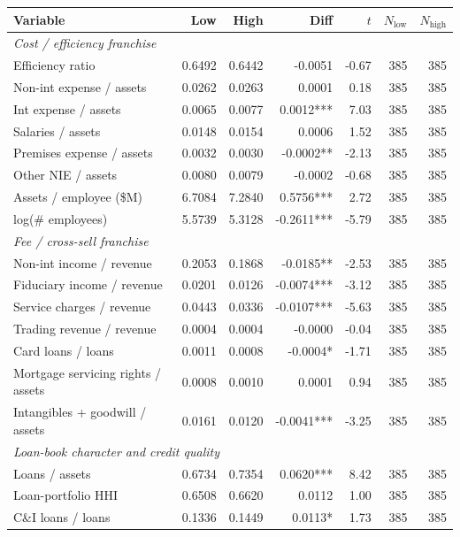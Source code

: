 \begin{tabular}{lrrrrrr}
\toprule
Variable & Low & High & Diff & $t$ & $N_{\text{low}}$ & $N_{\text{high}}$ \\
\midrule
\multicolumn{7}{l}{\emph{Cost / efficiency franchise}} \\
\midrule
Efficiency ratio & 0.6492 & 0.6442 & -0.0051 & -0.67 & 385 & 385 \\
Non-int expense / assets & 0.0262 & 0.0263 & 0.0001 & 0.18 & 385 & 385 \\
Int expense / assets & 0.0065 & 0.0077 & 0.0012*** & 7.03 & 385 & 385 \\
Salaries / assets & 0.0148 & 0.0154 & 0.0006 & 1.52 & 385 & 385 \\
Premises expense / assets & 0.0032 & 0.0030 & -0.0002** & -2.13 & 385 & 385 \\
Other NIE / assets & 0.0080 & 0.0079 & -0.0002 & -0.68 & 385 & 385 \\
Assets / employee (\$M) & 6.7084 & 7.2840 & 0.5756*** & 2.72 & 385 & 385 \\
log(\# employees) & 5.5739 & 5.3128 & -0.2611*** & -5.79 & 385 & 385 \\
\midrule
\multicolumn{7}{l}{\emph{Fee / cross-sell franchise}} \\
\midrule
Non-int income / revenue & 0.2053 & 0.1868 & -0.0185** & -2.53 & 385 & 385 \\
Fiduciary income / revenue & 0.0201 & 0.0126 & -0.0074*** & -3.12 & 385 & 385 \\
Service charges / revenue & 0.0443 & 0.0336 & -0.0107*** & -5.63 & 385 & 385 \\
Trading revenue / revenue & 0.0004 & 0.0004 & -0.0000 & -0.04 & 385 & 385 \\
Card loans / loans & 0.0011 & 0.0008 & -0.0004* & -1.71 & 385 & 385 \\
Mortgage servicing rights / assets & 0.0008 & 0.0010 & 0.0001 & 0.94 & 385 & 385 \\
Intangibles + goodwill / assets & 0.0161 & 0.0120 & -0.0041*** & -3.25 & 385 & 385 \\
\midrule
\multicolumn{7}{l}{\emph{Loan-book character and credit quality}} \\
\midrule
Loans / assets & 0.6734 & 0.7354 & 0.0620*** & 8.42 & 385 & 385 \\
Loan-portfolio HHI & 0.6508 & 0.6620 & 0.0112 & 1.00 & 385 & 385 \\
C\&I loans / loans & 0.1336 & 0.1449 & 0.0113* & 1.73 & 385 & 385 \\

\end{tabular}
